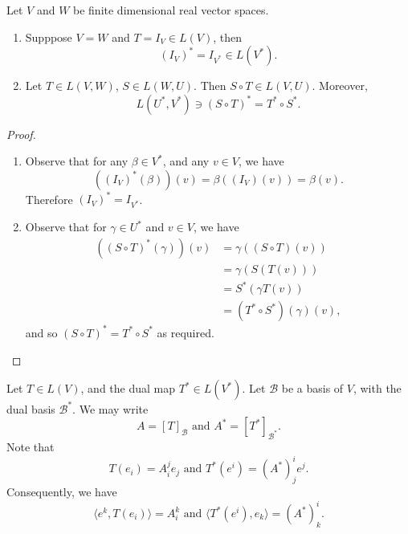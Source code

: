 \documentclass[notoc,notitlepage]{tufte-book}
\begin{document}
\begin{propo}\label{propo:identity_and_composition_of_the_dual_map}
  Let $V$ and $W$ be finite dimensional real vector spaces.
  \begin{enumerate}
    \item Supppose $V = W$ and $T = I_V \in L(V)$, then
      \begin{equation*}
        (I_V)^* = I_{V^*} \in L(V^*).
      \end{equation*}

    \item Let $T \in L(V, W)$, $S \in L(W, U)$. Then
      $S \circ T \in L(V, U)$. Moreover,
      \begin{equation*}
        L \left( U^*, V^* \right) \ni ( S \circ T )^* = T^* \circ S^*.
      \end{equation*}
  \end{enumerate}
\end{propo}

\begin{proof}
  \begin{enumerate}
    \item Observe that for any $\beta \in V^*$, and any $v \in V$,
      we have
      \begin{equation*}
        ((I_V)^*(\beta))(v) = \beta((I_V)(v)) = \beta(v).
      \end{equation*}
      Therefore $(I_V)^* = I_{V^*}$.

    \item Observe that for $\gamma \in U^*$ and $v \in V$, we have
      \begin{align*}
        ((S \circ T)^*(\gamma))(v)
          &= \gamma ( ( S \circ T ) (v) ) \\
          &= \gamma ( S ( T ( v ) ) ) \\
          &= S^* ( \gamma T(v) ) \\
          &= ( T^* \circ S^* )(\gamma)(v),
      \end{align*}
      and so $( S \circ T )^* = T^* \circ S^*$ as required.
  \end{enumerate}
\end{proof}

Let $T \in L(V)$, and the dual map $T^* \in L(V^*)$.
Let $\mathcal{B}$ be a basis of $V$, with the dual basis
$\mathcal{B}^*$. We may write
\begin{equation*}
  A = [T]_{\mathcal{B}} \text{ and } A^* = [T^*]_{\mathcal{B}^*}.
\end{equation*}
Note that
\begin{equation*}
  T(e_i) = A_i^j e_j \text{ and } T^*(e^i) = (A^*)_j^i e^j.
\end{equation*}
Consequently, we have
\begin{equation*}
  \langle e^k, T( e_i ) \rangle = A_i^k \text{ and }
  \langle T^*(e^i), e_k \rangle = (A^*)_k^i.
\end{equation*}
\end{document}
